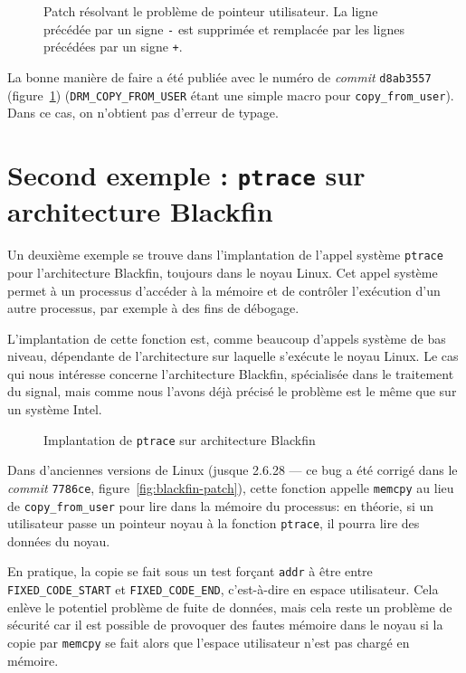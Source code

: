 \begin{figure}

  \caption[Patch résolvant le problème de pointeur utilisateur.]
      {Patch résolvant le problème de pointeur utilisateur.
       La ligne précédée par un signe \texttt{-} est supprimée et remplacée
       par les lignes précédées par un signe \texttt{+}.
      }
\label{fig:linux-patch}
\end{figure}

La bonne manière de faire a été publiée avec le numéro de \emph{commit}
\texttt{d8ab3557} (figure~\ref{fig:linux-patch}) (\texttt{DRM\_COPY\_FROM\_USER}
étant une simple macro pour \texttt{copy\_from\_user}). Dans ce cas, on
n'obtient pas d'erreur de typage.

\section{Second exemple : \texttt{ptrace} sur architecture Blackfin}

Un deuxième exemple se trouve dans l'implantation de l'appel système
\texttt{ptrace} pour l'architecture Blackfin, toujours dans le noyau Linux. Cet
appel système permet à un processus d'accéder à la mémoire et de contrôler
l'exécution d'un autre processus, par exemple à des fins de débogage.

L'implantation de cette fonction est, comme beaucoup d'appels système de bas
niveau, dépendante de l'architecture sur laquelle s'exécute le noyau Linux. Le
cas qui nous intéresse concerne l'architecture Blackfin, spécialisée dans le
traitement du signal, mais comme nous l'avons déjà précisé le problème est le
même que sur un système Intel.

\begin{figure}
    \caption{Implantation de \texttt{ptrace} sur architecture Blackfin}
    \label{fig:ptrace-blackfin}
\end{figure}

Dans d'anciennes versions de Linux (jusque 2.6.28 --- ce bug a été corrigé dans
le \emph{commit} \texttt{7786ce}, figure~\ref{fig:blackfin-patch}), cette
fonction appelle \texttt{memcpy} au lieu de \texttt{copy\_from\_user} pour lire
dans la mémoire du processus: en théorie, si un utilisateur passe un pointeur
noyau à la fonction \texttt{ptrace}, il pourra lire des données du noyau.

En pratique, la copie se fait sous un test forçant \texttt{addr} à être entre
\texttt{FIXED\_CODE\_START} et \texttt{FIXED\_CODE\_END}, c'est-à-dire en espace
utilisateur. Cela enlève le potentiel problème de fuite de données, mais cela
reste un problème de sécurité car il est possible de provoquer des fautes
mémoire dans le noyau si la copie par \texttt{memcpy} se fait alors que l'espace
utilisateur n'est pas chargé en mémoire.

